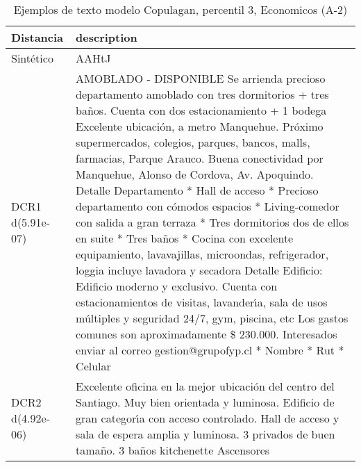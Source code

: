 \begin{table}[H]
\centering
\fontsize{10}{14}\selectfont
\caption{Ejemplos de texto modelo Copulagan, percentil 3, Economicos (A-2)}
\label{table-example-economicos-a-2-copulagan-3p-text}
\begin{tabular}{|l|m{35em}|}
\hline
\rowcolor[gray]{0.8}
Distancia & description \\
\hline Sintético & AAHtJ \\
\hline DCR1 d(5.91e-07) & AMOBLADO - DISPONIBLE   Se arrienda precioso departamento amoblado con tres dormitorios + tres ba\~nos. Cuenta con dos estacionamiento + 1 bodega  Excelente ubicaci\'on, a metro Manquehue. Pr\'oximo supermercados, colegios, parques, bancos, malls, farmacias, Parque Arauco. Buena conectividad por Manquehue, Alonso de Cordova, Av. Apoquindo.  Detalle Departamento * Hall de acceso * Precioso departamento con c\'omodos espacios * Living-comedor con salida a gran terraza  * Tres dormitorios dos de ellos en suite * Tres ba\~nos * Cocina con excelente equipamiento, lavavajillas, microondas, refrigerador, loggia incluye lavadora y secadora   Detalle Edificio: Edificio moderno y exclusivo. Cuenta con estacionamientos de visitas, lavander{\'\i}a, sala de usos m\'ultiples y seguridad 24/7, gym, piscina, etc  Los gastos comunes son aproximadamente \$ 230.000.  Interesados enviar al correo gestion@grupofyp.cl * Nombre * Rut * Celular \\
\hline DCR2 d(4.92e-06) & Excelente oficina en la mejor ubicaci\'on del centro del Santiago. Muy bien orientada y luminosa.  Edificio de gran categor{\'\i}a con acceso controlado. 
Hall de acceso y sala de espera amplia y luminosa.
3 privados de buen tama\~no.
3 ba\~nos 
kitchenette 
Ascensores \\
\hline
\end{tabular}
\end{table}
